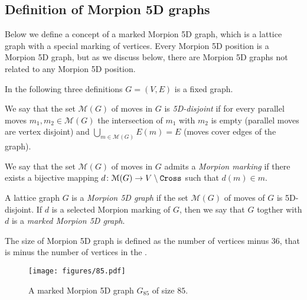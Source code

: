 
\subsection{Definition of Morpion 5D graphs}

Below we define a concept of a marked Morpion 5D graph, which is a lattice graph with a special marking of vertices. Every Morpion 5D position is
a Morpion 5D graph, but as we discuss below, there are Morpion 5D graphs not related to any Morpion 5D position.

In the following 
three definitions  $G = (V, E)$ is a fixed graph. 

\begin{definition} 
We say that the set $\mathcal{M}(G)$ of moves in $G$ is \emph{5D-disjoint}
if for every parallel moves $m_1, m_2 \in \mathcal{M}(G)$ the intersection of $m_1$ with $m_2$ is empty (parallel moves are vertex disjoint) and $\bigcup_{m \in \mathcal{M}(G)} E(m) = E$ (moves cover edges of the graph).
\end{definition}

\begin{definition}
  We say that the set $\mathcal{M}(G)$ of moves in $G$ admits a \emph{Morpion marking} if
     there exists a bijective mapping $d \colon \mathcal{M}(G) \to V \setminus \texttt{Cross}$ such that $d(m) \in m$.
\end{definition}

\begin{definition}
  A lattice graph $G$ is a \emph{Morpion 5D graph} if 
    the set $\mathcal{M}(G)$ of moves of $G$ is 5D-disjoint.
  If $d$ is a selected Morpion marking of $G$, then we say that $G$ togther with $d$ is 
    a \emph{marked Morpion 5D graph}.
    
  The size of Morpion 5D graph  is defined as the number of vertices minus $36$, that is minus the number of vertices in the \Cross.
 \end{definition}


\begin{figure}[h]
    \centering
    \texttt{[image: figures/85.pdf]}
     \caption{
     A marked Morpion 5D graph $G_{85}$ of size $85$.
	}
    \label{fig:85}
\end{figure}

